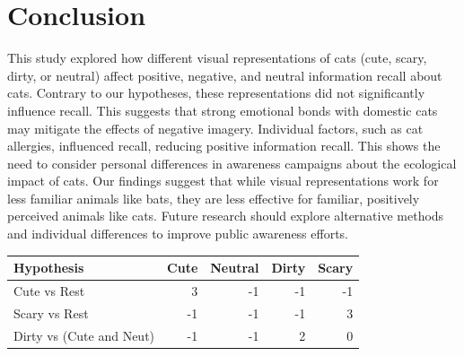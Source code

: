 \documentclass[
  man,
  longtable,
  nolmodern,
  notxfonts,
  notimes,
  colorlinks=true,linkcolor=blue,citecolor=blue,urlcolor=blue]{apa7}
\begin{document}
\section{Conclusion}\label{conclusion}

This study explored how different visual representations of cats (cute,
scary, dirty, or neutral) affect positive, negative, and neutral
information recall about cats. Contrary to our hypotheses, these
representations did not significantly influence recall. This suggests
that strong emotional bonds with domestic cats may mitigate the effects
of negative imagery. Individual factors, such as cat allergies,
influenced recall, reducing positive information recall. This shows the
need to consider personal differences in awareness campaigns about the
ecological impact of cats. Our findings suggest that while visual
representations work for less familiar animals like bats, they are less
effective for familiar, positively perceived animals like cats. Future
research should explore alternative methods and individual differences
to improve public awareness efforts.

\begin{table}

{\caption{{Planned contrasts.}{\label{tbl-contrasts}}}
\vspace{-20pt}}

\begin{longtable}[]{@{}lrrrr@{}}
\toprule\noalign{}
Hypothesis & Cute & Neutral & Dirty & Scary \\
\midrule\noalign{}
\endhead
\bottomrule\noalign{}
\endlastfoot
Cute vs Rest & 3 & -1 & -1 & -1 \\
Scary vs Rest & -1 & -1 & -1 & 3 \\
Dirty vs (Cute and Neut) & -1 & -1 & 2 & 0 \\
\end{longtable}

\end{table}
\end{document}
